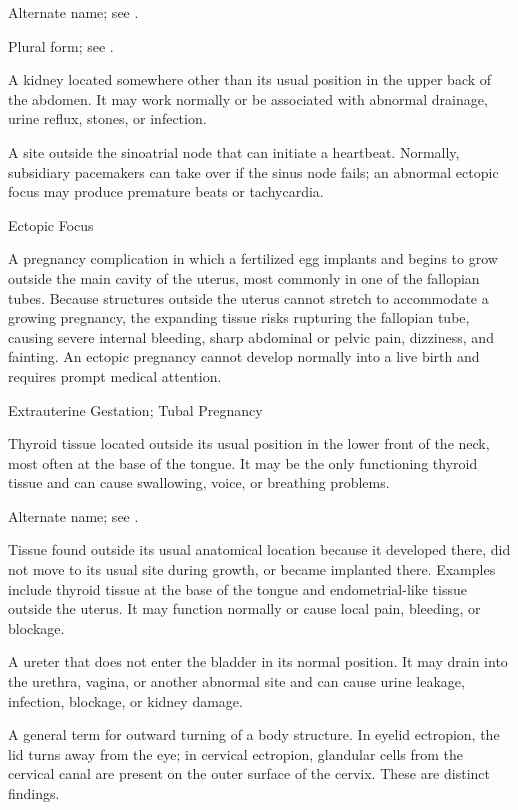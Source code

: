  Alternate name; see .

 Plural form; see .

 A kidney located somewhere other than its usual position in the upper back of the abdomen. It may work normally or be associated with abnormal drainage, urine reflux, stones, or infection.

 A site outside the sinoatrial node that can initiate a heartbeat. Normally, subsidiary pacemakers can take over if the sinus node fails; an abnormal ectopic focus may produce premature beats or tachycardia.

\synonyms
Ectopic Focus

 A pregnancy complication in which a fertilized egg implants and begins to grow outside the main cavity of the uterus, most commonly in one of the fallopian tubes. Because structures outside the uterus cannot stretch to accommodate a growing pregnancy, the expanding tissue risks rupturing the fallopian tube, causing severe internal bleeding, sharp abdominal or pelvic pain, dizziness, and fainting. An ectopic pregnancy cannot develop normally into a live birth and requires prompt medical attention.

\synonyms
Extrauterine Gestation; Tubal Pregnancy

 Thyroid tissue located outside its usual position in the lower front of the neck, most often at the base of the tongue. It may be the only functioning thyroid tissue and can cause swallowing, voice, or breathing problems.

 Alternate name; see .

 Tissue found outside its usual anatomical location because it developed there, did not move to its usual site during growth, or became implanted there. Examples include thyroid tissue at the base of the tongue and endometrial-like tissue outside the uterus. It may function normally or cause local pain, bleeding, or blockage.

 A ureter that does not enter the bladder in its normal position. It may drain into the urethra, vagina, or another abnormal site and can cause urine leakage, infection, blockage, or kidney damage.

 A general term for outward turning of a body structure. In eyelid ectropion, the lid turns away from the eye; in cervical ectropion, glandular cells from the cervical canal are present on the outer surface of the cervix. These are distinct findings.

